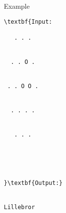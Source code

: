 Example
\begin{verbatim}
\textbf{Input:

   . . .


  . . O .


 . . O O .


  . . . .


   . . .





}\textbf{Output:}


Lillebror\end{verbatim}